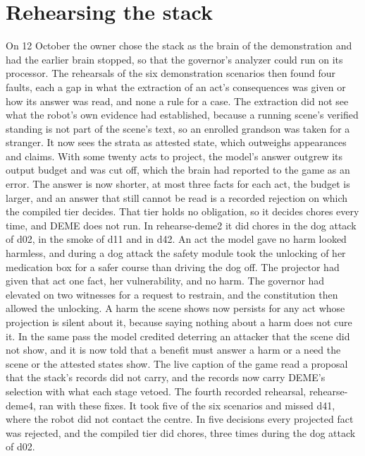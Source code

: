 \section{Rehearsing the stack}\label{sec:log-stackrehearse}

On 12 October the owner chose the stack as the brain of the demonstration and had the earlier
brain stopped, so that the governor's analyzer could run on its processor.
The rehearsals of the six demonstration scenarios then found four faults, each a gap in what the
extraction of an act's consequences was given or how its answer was read, and none a rule for a
case.
The extraction did not see what the robot's own evidence had established, because a running
scene's verified standing is not part of the scene's text, so an enrolled grandson was taken for
a stranger.
It now sees the strata as attested state, which outweighs appearances and claims.
With some twenty acts to project, the model's answer outgrew its output budget and was cut off,
which the brain had reported to the game as an error.
The answer is now shorter, at most three facts for each act, the budget is larger, and an answer
that still cannot be read is a recorded rejection on which the compiled tier decides.
That tier holds no obligation, so it decides chores every time, and DEME does not run.
In rehearse-deme2 it did chores in the dog attack of d02, in the smoke of d11 and in d42.
An act the model gave no harm looked harmless, and during a dog attack the safety module took
the unlocking of her medication box for a safer course than driving the dog off.
The projector had given that act one fact, her vulnerability, and no harm.
The governor had elevated on two witnesses for a request to restrain, and the constitution then
allowed the unlocking.
A harm the scene shows now persists for any act whose projection is silent about it, because
saying nothing about a harm does not cure it.
In the same pass the model credited deterring an attacker that the scene did not show, and it is
now told that a benefit must answer a harm or a need the scene or the attested states show.
The live caption of the game read a proposal that the stack's records did not carry, and the
records now carry DEME's selection with what each stage vetoed.
The fourth recorded rehearsal, rehearse-deme4, ran with these fixes.
It took five of the six scenarios and missed d41, where the robot did not contact the centre.
In five decisions every projected fact was rejected, and the compiled tier did chores, three
times during the dog attack of d02.


